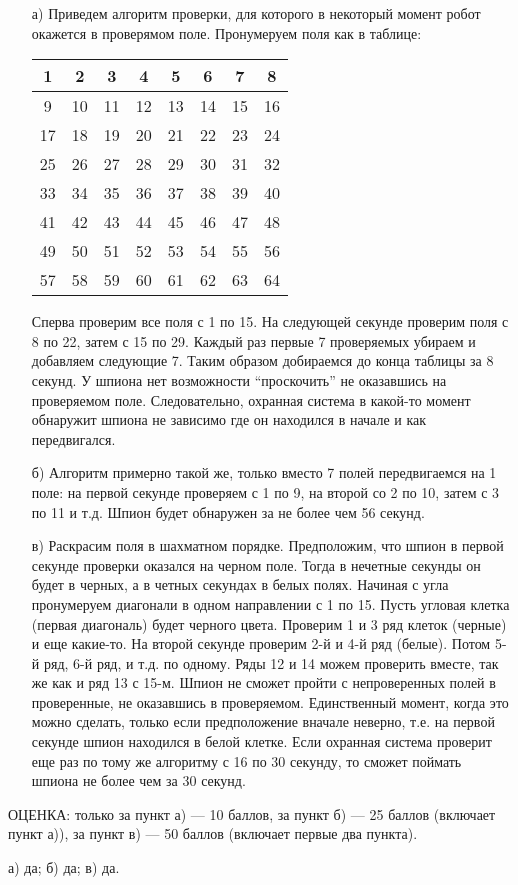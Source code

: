 \solutionSection
\begin{enumerate}
    \item [а)] Приведем алгоритм проверки, для которого в некоторый момент робот окажется в проверямом поле. Пронумеруем поля как в таблице:
    \begin{center}
    \begin{tabular}{|c|c|c|c|c|c|c|c|}\hline
     {1} &  {2} &  {3} &  {4} &  {5} &  {6} &  {7} &  {8}\\\hline
     {9} &  {10} &  {11} &  {12} &  {13} &  {14} &  {15} &  {16}\\\hline
     {17} &  {18} &  {19} &  {20} &  {21} &  {22} &  {23} &  {24}\\\hline
     {25} &  {26} &  {27} &  {28} &  {29} &  {30} &  {31} &  {32}\\\hline
     {33} &  {34} &  {35} &  {36} &  {37} &  {38} &  {39} &  {40}\\\hline
     {41} &  {42} &  {43} &  {44} &  {45} &  {46} &  {47} &  {48}\\\hline
     {49} &  {50} &  {51} &  {52} &  {53} &  {54} &  {55} &  {56}\\\hline
     {57} &  {58} &  {59} &  {60} &  {61} &  {62} &  {63} &  {64}\\\hline
    \end{tabular}
    \end{center}
    
    
    Сперва проверим все поля с 1 по 15. На следующей секунде проверим поля с 8 по 22, затем с 15 по 29. Каждый раз первые 7 проверяемых убираем и добавляем следующие 7. Таким образом добираемся до конца таблицы за 8 секунд. У шпиона нет возможности ``проскочить'' не оказавшись на проверяемом поле. Следовательно, охранная система в какой-то момент обнаружит шпиона не зависимо где он находился в начале и как передвигался.
    
    \item [б)] Алгоритм примерно такой же, только вместо 7 полей передвигаемся на 1 поле: на первой секунде проверяем с 1 по 9, на второй со 2 по 10, затем с 3 по 11 и т.д. Шпион будет обнаружен за не более чем 56 секунд.
    
    \item [в)] Раскрасим поля в шахматном порядке. Предположим, что шпион в первой секунде проверки оказался на черном поле. Тогда в нечетные секунды он будет в черных, а в четных секундах в белых полях. Начиная с угла пронумеруем диагонали в одном направлении с 1 по 15. Пусть угловая клетка (первая диагональ) будет черного цвета. Проверим 1 и 3 ряд клеток (черные) и еще какие-то. На второй секунде проверим 2-й и 4-й ряд (белые). Потом 5-й ряд, 6-й ряд, и т.д. по одному. Ряды 12 и 14 можем проверить вместе, так же как и ряд 13 с 15-м. Шпион не сможет пройти с непроверенных полей в проверенные, не оказавшись в проверяемом. Единственный момент, когда это можно сделать, только если предположение вначале неверно, т.е. на первой секунде шпион находился в белой клетке. Если охранная система проверит еще раз по тому же алгоритму с 16 по 30 секунду, то сможет поймать шпиона не более чем за 30 секунд.
    
  
\end{enumerate}

\additionalCriteria 
ОЦЕНКА: только за пункт а) --- 10 баллов, за пункт б) --- 25 баллов (включает пункт а)), за пункт в) --- 50 баллов (включает первые два пункта).

\answerMath
а) да; б) да; в) да.   